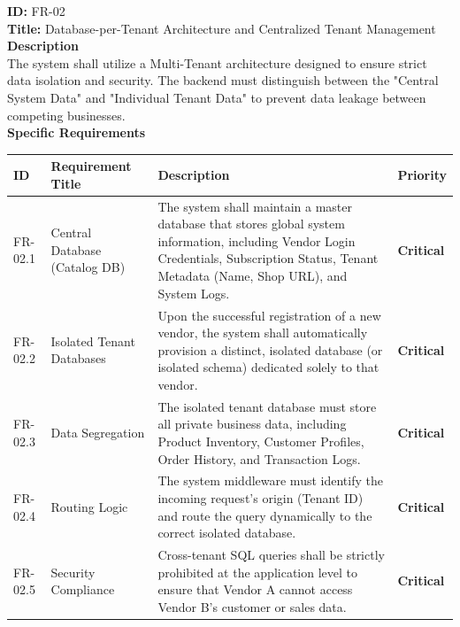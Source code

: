 \textbf{ID:} FR-02 \\
\textbf{Title:} Database-per-Tenant Architecture and Centralized Tenant Management\\
\textbf{Description}\\
The system shall utilize a Multi-Tenant architecture designed to ensure strict data isolation and security. The backend must distinguish between the "Central System Data" and "Individual Tenant Data" to prevent data leakage between competing businesses.\\
\textbf{Specific Requirements}
\begin{table}[H]
\centering
\label{tab:multi-tenant-requirements}
\begin{tabular}{>{\raggedright\arraybackslash}p{2cm}>{\raggedright\arraybackslash}p{3.5cm}>{\raggedright\arraybackslash}p{7cm}>{\centering\arraybackslash}p{2cm}}
\toprule
\textbf{ID} & \textbf{Requirement Title} & \textbf{Description} & \textbf{Priority} \\
\midrule
FR-02.1 & Central Database (Catalog DB) & The system shall maintain a master database that stores global system information, including Vendor Login Credentials, Subscription Status, Tenant Metadata (Name, Shop URL), and System Logs. & \textcolor{criticalcolor}{\textbf{Critical}} \\
\midrule
FR-02.2 & Isolated Tenant Databases & Upon the successful registration of a new vendor, the system shall automatically provision a distinct, isolated database (or isolated schema) dedicated solely to that vendor. & \textcolor{criticalcolor}{\textbf{Critical}} \\
\midrule
FR-02.3 & Data Segregation & The isolated tenant database must store all private business data, including Product Inventory, Customer Profiles, Order History, and Transaction Logs. & \textcolor{criticalcolor}{\textbf{Critical}} \\
\midrule
FR-02.4 & Routing Logic & The system middleware must identify the incoming request's origin (Tenant ID) and route the query dynamically to the correct isolated database. & \textcolor{criticalcolor}{\textbf{Critical}} \\
\midrule
FR-02.5 & Security Compliance & Cross-tenant SQL queries shall be strictly prohibited at the application level to ensure that Vendor A cannot access Vendor B's customer or sales data. & \textcolor{criticalcolor}{\textbf{Critical}} \\
\bottomrule
\end{tabular}
\end{table}


